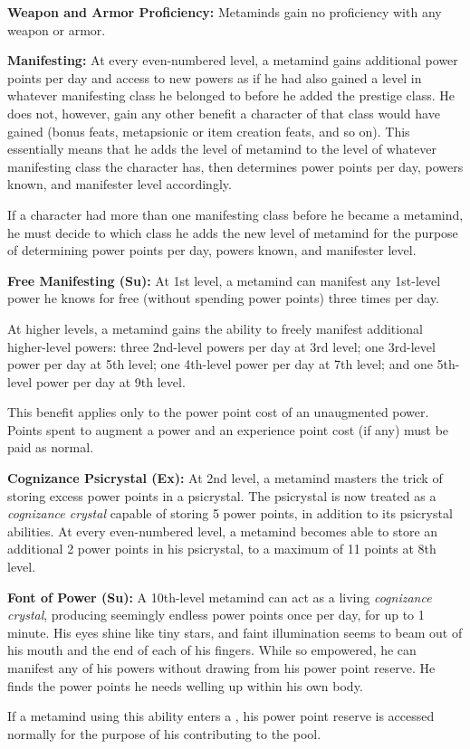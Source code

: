{
\textbf{Weapon and Armor Proficiency:} Metaminds gain no proficiency with any weapon or armor.

\textbf{Manifesting:} At every even-numbered level, a metamind gains additional power points per day and access to new powers as if he had also gained a level in whatever manifesting class he belonged to before he added the prestige class. He does not, however, gain any other benefit a character of that class would have gained (bonus feats, metapsionic or item creation feats, and so on). This essentially means that he adds the level of metamind to the level of whatever manifesting class the character has, then determines power points per day, powers known, and manifester level accordingly.

If a character had more than one manifesting class before he became a metamind, he must decide to which class he adds the new level of metamind for the purpose of determining power points per day, powers known, and manifester level.

\textbf{Free Manifesting (Su):} At 1st level, a metamind can manifest any 1st-level power he knows for free (without spending power points) three times per day.

At higher levels, a metamind gains the ability to freely manifest additional higher-level powers: three 2nd-level powers per day at 3rd level; one 3rd-level power per day at 5th level; one 4th-level power per day at 7th level; and one 5th-level power per day at 9th level.

This benefit applies only to the power point cost of an unaugmented power. Points spent to augment a power and an experience point cost (if any) must be paid as normal.

\textbf{Cognizance Psicrystal (Ex):} At 2nd level, a metamind masters the trick of storing excess power points in a psicrystal. The psicrystal is now treated as a \emph{cognizance crystal} capable of storing 5 power points, in addition to its psicrystal abilities. At every even-numbered level, a metamind becomes able to store an additional 2 power points in his psicrystal, to a maximum of 11 points at 8th level.

\textbf{Font of Power (Su):} A 10th-level metamind can act as a living \emph{cognizance crystal}, producing seemingly endless power points once per day, for up to 1 minute. His eyes shine like tiny stars, and faint illumination seems to beam out of his mouth and the end of each of his fingers. While so empowered, he can manifest any of his powers without drawing from his power point reserve. He finds the power points he needs welling up within his own body.

If a metamind using this ability enters a , his power point reserve is accessed normally for the purpose of his contributing to the pool.
}
